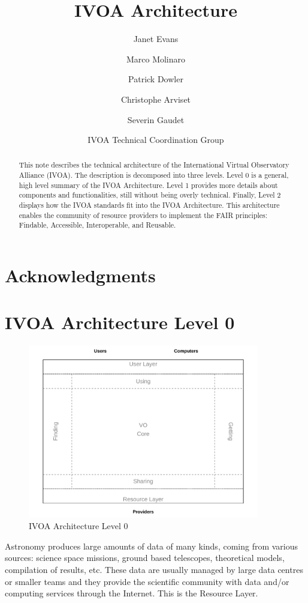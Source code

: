 \documentclass[11pt,letter]{ivoa}
\title{IVOA Architecture}
\author{Janet Evans}
\author{Marco Molinaro}
\author{Patrick Dowler}
\author{Christophe Arviset}
\author{Severin Gaudet}
\author{IVOA Technical Coordination Group}
\begin{document}
\begin{abstract}
This note describes the technical architecture of the International
Virtual Observatory Alliance
(IVOA). The description is decomposed 
into three levels. Level 0 is a general, high level summary of the IVOA
Architecture.
Level 1 provides more details about components and functionalities,
still without
being overly technical. Finally, Level 2 displays how the IVOA standards
fit into
the IVOA Architecture. This architecture enables the community of
resource providers to
implement the FAIR principles: Findable, Accessible, Interoperable, and
Reusable.
\end{abstract}

\section*{Acknowledgments}

\section{IVOA Architecture Level 0}

\begin{figure}[h]
\centering
\includegraphics[width=0.9\textwidth]{archdiag0.pdf}
\caption{IVOA Architecture Level 0}
\label{fig:architecture0}
\end{figure}

Astronomy produces large amounts of data of many kinds, coming from
various sources:
science space missions, ground based telescopes, theoretical models,
compilation of
results, etc. These data are usually managed by large data centres or
smaller teams
and they provide the scientific community with data and/or computing
services
through the Internet. This is the Resource Layer. 
\end{document}
